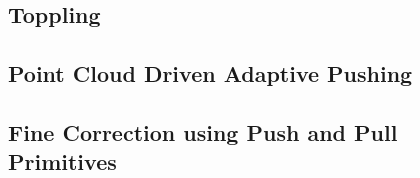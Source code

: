 \subsection{Toppling}


\subsection{Point Cloud Driven Adaptive Pushing}


\subsection{Fine Correction using Push and Pull Primitives}
